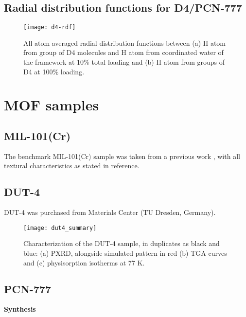 \subsection{Radial distribution functions for D4/PCN-777}\label{si-radial-distribution}

\begin{figure}[H]
    \centering
    \texttt{[image: d4-rdf]}
    \caption{%
        All-atom averaged radial distribution functions between (a) H atom from
         group of D4 molecules and H atom from coordinated water of the
        framework at 10\% total loading and (b) H atom from  groups of D4 at
        100\% loading.
    }\label{fig:d4-rdf}
\end{figure}

\pagebreak

\section{MOF samples}\label{mof-samples}

\subsection{MIL-101(Cr)}

The benchmark MIL-101(Cr) sample was taken from a previous work
\citep{pillaiCapturePerformancesHybrid2017}, with all textural characteristics
as stated in reference.

\subsection{DUT-4}

DUT-4 was purchased from Materials Center (TU Dresden, Germany).

\begin{figure}[H]
    \centering
    \texttt{[image: dut4\_summary]}
    \caption{%
        Characterization of the DUT-4 sample, in duplicates as black
        and blue: (a) PXRD, alongside simulated pattern in red (b) TGA curves
        and (c)  physisorption isotherms at 77 K.
    }\label{fig:dut4-summary}
\end{figure}

\subsection{PCN-777}

\textbf{Synthesis}

